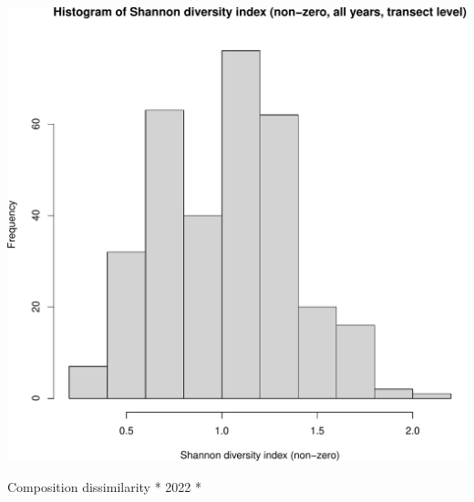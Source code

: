 \documentclass[
]{article}
\begin{document}
\includegraphics{log-project-aubrie-winnie_files/figure-latex/unnamed-chunk-11-1.pdf}

Composition dissimilarity * 2022 *
\end{document}
